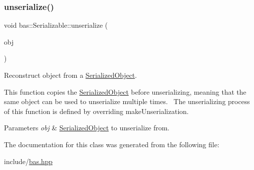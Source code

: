 \subsubsection{\texorpdfstring{unserialize()}{unserialize()}}
{\footnotesize\ttfamily void bas\+::\+Serializable\+::unserialize (\begin{DoxyParamCaption}\item[{\mbox{\hyperlink{classbas_1_1SerializedObject}{Serialized\+Object}}}]{obj }\end{DoxyParamCaption})\hspace{0.3cm}{\ttfamily [inline]}}



Reconstruct object from a \mbox{\hyperlink{classbas_1_1SerializedObject}{Serialized\+Object}}. 

This function copies the \mbox{\hyperlink{classbas_1_1SerializedObject}{Serialized\+Object}} before unserializing, meaning that the same object can be used to unserialize multiple times.~\newline
The unserializing process of this function is defined by overriding make\+Unserialization. 
\begin{DoxyParams}{Parameters}
{\em obj} & \mbox{\hyperlink{classbas_1_1SerializedObject}{Serialized\+Object}} to unserialize from. \\
\hline
\end{DoxyParams}


The documentation for this class was generated from the following file\+:\begin{DoxyCompactItemize}
\item 
include/\mbox{\hyperlink{bas_8hpp}{bas.\+hpp}}\end{DoxyCompactItemize}
